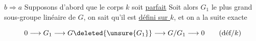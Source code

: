 $b\Rightarrow a$  Supposons d'abord que le corps  $k$ soit \uline{parfait} Soit alors $G_1$ le plus grand sous-groupe linéaire de $G$, on sait qu'il est \uline{défini sur $k$}, et on a la suite exacte

\[0\longrightarrow G_1\longrightarrow G\deleted{\unsure{G_1}}\longrightarrow G/G_1\longrightarrow0\qquad(\text{déf}/k)\]


